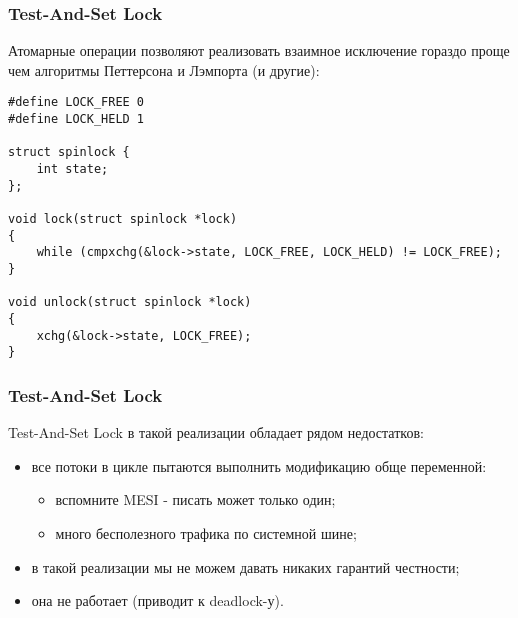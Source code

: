 \begin{frame}[fragile]
\frametitle{Test-And-Set Lock}

Атомарные операции позволяют реализовать взаимное исключение гораздо проще чем
алгоритмы Петтерсона и Лэмпорта (и другие):

\begin{lstlisting}
#define LOCK_FREE 0
#define LOCK_HELD 1

struct spinlock {
    int state;
};

void lock(struct spinlock *lock)
{
    while (cmpxchg(&lock->state, LOCK_FREE, LOCK_HELD) != LOCK_FREE);
}

void unlock(struct spinlock *lock)
{
    xchg(&lock->state, LOCK_FREE);
}
\end{lstlisting}
\end{frame}

\begin{frame}
\frametitle{Test-And-Set Lock}

Test-And-Set Lock в такой реализации обладает рядом недостатков:
\begin{itemize}
  \item<2-> все потоки в цикле пытаются выполнить модификацию обще переменной:
        \begin{itemize}
          \item вспомните MESI - писать может только один;
          \item много бесполезного трафика по системной шине;
        \end{itemize}
  \item<3-> в такой реализации мы не можем давать никаких гарантий честности;
  \item<4-> она не работает (приводит к deadlock-у).
\end{itemize}
\end{frame}

